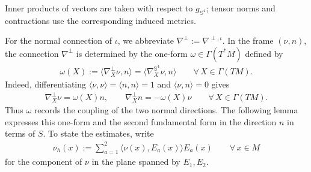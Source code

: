 \documentclass[a4paper,11pt,oneside,reqno]{amsart}
\numberwithin{equation}{section}
\theoremstyle{definition}
\begin{document}
Inner products of vectors are taken with respect to $g_{\mathbb{S}^4}$; tensor norms and contractions use the corresponding induced metrics.

For the normal connection of $\iota$, we abbreviate $\nabla^\perp:=\nabla^{\perp,\iota}$. In the frame $(\nu,n)$, the connection $\nabla^{\perp}$ is determined by the one-form $\omega\in\Gamma(T^*M)$ defined by
%
\begin{align}
    \label{eq:s4-omega-definition}
    \omega(X):=\langle\nabla^\perp_X\nu,n\rangle
    =\langle\nabla^{\mathbb{S}^4}_X\nu,n\rangle
    \qquad\forall\,X\in\Gamma(TM).
\end{align}
%
Indeed, differentiating
$\langle\nu,\nu\rangle=\langle n,n\rangle=1$ and
$\langle\nu,n\rangle=0$ gives
%
\begin{align}
    \label{eq:s4-normal-connection-frame}
    \nabla^\perp_X\nu=\omega(X)n,
    \qquad
    \nabla^\perp_Xn=-\omega(X)\nu
    \qquad\forall\,X\in\Gamma(TM).
\end{align}
%
Thus $\omega$ records the coupling of the two normal directions.
The following lemma expresses this one-form and the second
fundamental form in the direction $n$ in terms of $S$. To state
the estimates, write
%
\begin{align*}
    \nu_h(x):=\sum_{a=1}^2
    \langle\nu(x),E_a(x)\rangle E_a(x)
    \qquad\forall\,x\in M
\end{align*}
%
for the component of $\nu$ in the plane spanned by $E_1,E_2$.
\end{document}
